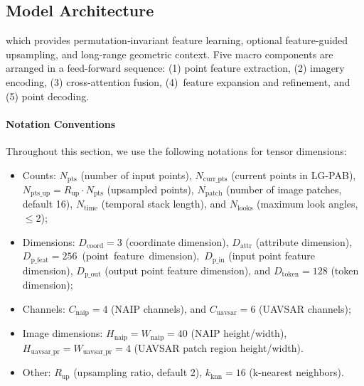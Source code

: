 \documentclass[remotesensing,article,accept,pdftex,moreauthors]{Definitions/mdpi}
\begin{document}
\subsection{Model Architecture}
\label{sec:architecture}
 which provides permutation‐invariant feature learning, optional feature-guided upsampling, and long-range geometric context. Five macro components are arranged in a feed-forward sequence: (1) point feature extraction, (2) imagery encoding, (3) cross-attention fusion, (4)~feature expansion and refinement, and (5) point decoding.






\paragraph{Notation Conventions}
Throughout this section, we use the following notations for tensor dimensions:
\begin{itemize}
    \item Counts: $N_{\text{pts}}$ (number of input points), $N_{\text{curr\_pts}}$ (current points in LG-PAB), \mbox{$N_{\text{pts\_up}} = R_{\text{up}} \cdot N_{\text{pts}}$} (upsampled points), $N_{\text{patch}}$ (number of image patches, default 16), $N_{\text{time}}$ (temporal stack length), and $N_{\text{looks}}$ (maximum look angles, $\leq$2);
    \item Dimensions: $D_{\text{coord}} = 3$ (coordinate dimension), $D_{\text{attr}}$ (attribute dimension), \mbox{$D_{\text{p\_feat}} = 256$ (point feature dimension), $D_{\text{p\_in}}$} (input point feature dimension), $D_{\text{p\_out}}$ (output point feature dimension), and $D_{\text{token}} = 128$ (token dimension);
    \item Channels: $C_{\text{naip}} = 4$ (NAIP channels), and $C_{\text{uavsar}} = 6$ (UAVSAR channels);
    \item Image dimensions: $H_{\text{naip}} = W_{\text{naip}} = 40$ (NAIP height/width), $H_{\text{uavsar\_pr}} = W_{\text{uavsar\_pr}} = 4$ (UAVSAR patch region height/width).
    \item Other: $R_{\text{up}}$ (upsampling ratio, default 2), $k_{\text{knn}} = 16$ (k-nearest neighbors).
\end{itemize}
\end{document}
